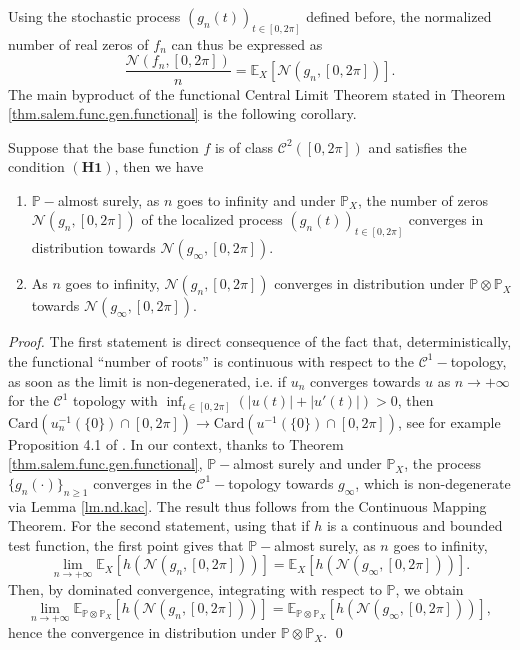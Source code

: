 \documentclass{svproc}
\newcommand{\Prob}{\mathbb{P}}
\newcommand \Esp {\mathbb{E}}
\begin{document}
Using the stochastic process $(g_n(t))_{t\in [0,2\pi]}$ defined before, the normalized number of real zeros of $f_n$ can thus be expressed as
\begin{equation} \label{eq.nb.zero.g}
\frac{\mathcal{N}(f_n,[0,2\pi])}{n} =\Esp_X\left[\mathcal{N}(g_n,[0,2\pi])\right].
\end{equation}
The main byproduct of the functional Central Limit Theorem stated in Theorem \ref{thm.salem.func.gen.functional} is the following corollary.
\begin{corollary} \label{cor.conv.nb.zeros} Suppose that the base function $f$ is of class $\mathcal{C}^2([0,2\pi])$ and satisfies the condition $\mathbf{(H1)}$, then we have
\begin{enumerate}
\item $\Prob-$almost surely, as $n$ goes to infinity and under $\mathbb P_X$, the number of zeros $\mathcal{N}(g_n,[0,2\pi])$ of the localized process $(g_n(t))_{t\in[0,2\pi]}$ converges in distribution towards $\mathcal{N}(g_{\infty},[0,2\pi])$. 
\item As $n$ goes to infinity, $\mathcal{N}(g_n,[0,2\pi])$ converges in distribution under $\Prob \otimes \Prob_X$ towards $\mathcal{N}(g_{\infty},[0,2\pi])$. 
\end{enumerate}
\end{corollary}
\begin{proof}
The first statement is direct consequence of the fact that, deterministically, the functional  ``number of roots'' is continuous with respect to  the $\mathcal{C}^1-$topology, as soon as the limit is non-degenerated, i.e.
if $u_n$ converges towards $u$ as $n\to +\infty$ for the $\mathcal{C}^1$ topology with $\inf_{t\in [0,2\pi]}(|u(t)|+|u'(t)|)>0$, then $\text{Card}\left(u_n^{-1}(\{0\})\cap [0,2\pi]\right)\to \text{Card}(u^{-1}(\{0\}) \cap [0,2\pi])$, see for example Proposition 4.1 of \cite{AP21}. In our context, thanks to Theorem \ref{thm.salem.func.gen.functional}, $\mathbb P-$almost surely and under $\mathbb P_X$, the process $\{g_n(\cdot)\}_{n\geq 1}$ converges in the $\mathcal{C}^1-$topology towards $g_{\infty}$, which is non-degenerate via Lemma \ref{lm.nd.kac}. The result thus follows from the Continuous Mapping Theorem.
For the second statement, using that if $h$ is a continuous and bounded test function, the first point gives that $\mathbb P-$almost surely, as $n$ goes to infinity,
$$\lim_{n\to+\infty} \Esp_X\left[h(\mathcal{N}(g_n,[0,2\pi]))\right]= \Esp_X\left[h(\mathcal{N}(g_{\infty},[0,2\pi]))\right].$$
Then, by dominated convergence, integrating with respect to $\mathbb P$, we obtain
\[
\lim_{n\to+\infty}\Esp_{\Prob \otimes \Prob_X} \left[h \left(\mathcal{N}(g_n,[0,2\pi])\right)\right] =\Esp_{\Prob \otimes \Prob_X}\left[h(\mathcal{N}(g_{\infty},[0,2\pi]))\right],
\]
hence the convergence in distribution under $\Prob \otimes \Prob_X$.
\qed
\end{proof}
\end{document}
